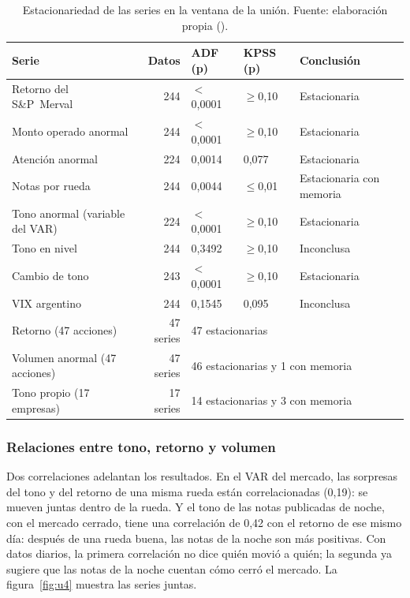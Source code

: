 \begin{table}[H]
\centering\small
\begin{tabular}{@{}lrlll@{}}
\toprule
\textbf{Serie} & \textbf{Datos} & \textbf{ADF (p)} & \textbf{KPSS (p)} & \textbf{Conclusión} \\
\midrule
Retorno del S\&P~Merval & 244 & $<$0,0001 & $\geq$0,10 & Estacionaria \\
Monto operado anormal & 244 & $<$0,0001 & $\geq$0,10 & Estacionaria \\
Atención anormal & 224 & 0,0014 & 0,077 & Estacionaria \\
Notas por rueda & 244 & 0,0044 & $\leq$0,01 & Estacionaria con memoria \\
Tono anormal (variable del VAR) & 224 & $<$0,0001 & $\geq$0,10 & Estacionaria \\
Tono en nivel & 244 & 0,3492 & $\geq$0,10 & Inconclusa \\
Cambio de tono & 243 & $<$0,0001 & $\geq$0,10 & Estacionaria \\
VIX argentino & 244 & 0,1545 & 0,095 & Inconclusa \\
\midrule
Retorno (47 acciones) & 47 series & \multicolumn{3}{l}{47 estacionarias} \\
Volumen anormal (47 acciones) & 47 series & \multicolumn{3}{l}{46 estacionarias y 1 con memoria} \\
Tono propio (17 empresas) & 17 series & \multicolumn{3}{l}{14 estacionarias y 3 con memoria} \\
\bottomrule
\end{tabular}
\caption{Estacionariedad de las series en la ventana de la unión. Fuente: elaboración propia
().}
\label{tab:u5}
\end{table}

\subsubsection{Relaciones entre tono, retorno y volumen}

Dos correlaciones adelantan los resultados. En el VAR del mercado, las sorpresas del tono y
del retorno de una misma rueda están correlacionadas (0,19): se mueven juntas dentro de la
rueda. Y el tono de las notas publicadas de noche, con el mercado cerrado, tiene una
correlación de 0,42 con el retorno de ese mismo día: después de una rueda buena, las notas de
la noche son más positivas. Con datos diarios, la primera correlación no dice quién movió a
quién; la segunda ya sugiere que las notas de la noche cuentan cómo cerró el mercado. La
figura~\ref{fig:u4} muestra las series juntas.

